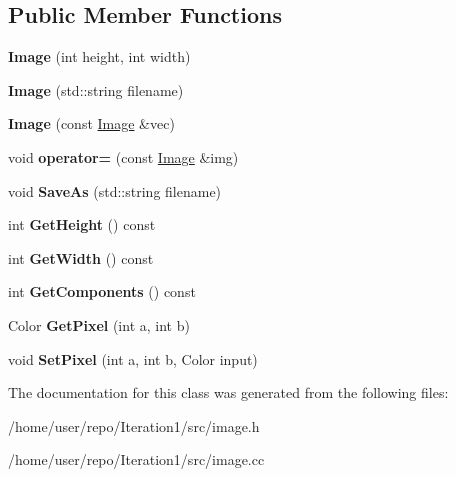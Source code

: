 \subsection*{Public Member Functions}
\begin{DoxyCompactItemize}
\item 
\mbox{\label{classImage_a6383baa72a87f006f0d1ab1ac19006eb}} 
{\bfseries Image} (int height, int width)
\item 
\mbox{\label{classImage_abb20937b3256735f0f7549d1b5e9c10d}} 
{\bfseries Image} (std\+::string filename)
\item 
\mbox{\label{classImage_ad06dec9531d61e2fd4c5fa761201bb20}} 
{\bfseries Image} (const \hyperlink{classImage}{Image} \&vec)
\item 
\mbox{\label{classImage_a4da7f72e4063bd0764caa635c0e0aaae}} 
void {\bfseries operator=} (const \hyperlink{classImage}{Image} \&img)
\item 
\mbox{\label{classImage_a3a9b278005e0731a93fe1d5d2cff7104}} 
void {\bfseries Save\+As} (std\+::string filename)
\item 
\mbox{\label{classImage_a631ead4be012caf49b3209d2ac401214}} 
int {\bfseries Get\+Height} () const
\item 
\mbox{\label{classImage_a3da5012d5e314ce03b53d77276232186}} 
int {\bfseries Get\+Width} () const
\item 
\mbox{\label{classImage_a72295fcd1c416436284a1a8fae68e2f8}} 
int {\bfseries Get\+Components} () const
\item 
\mbox{\label{classImage_a5518f009939758554a3177b13414cc68}} 
Color {\bfseries Get\+Pixel} (int a, int b)
\item 
\mbox{\label{classImage_ad8230d239bf601268eda4f0ae757e3c3}} 
void {\bfseries Set\+Pixel} (int a, int b, Color input)
\end{DoxyCompactItemize}


The documentation for this class was generated from the following files\+:\begin{DoxyCompactItemize}
\item 
/home/user/repo/\+Iteration1/src/image.\+h\item 
/home/user/repo/\+Iteration1/src/image.\+cc\end{DoxyCompactItemize}
